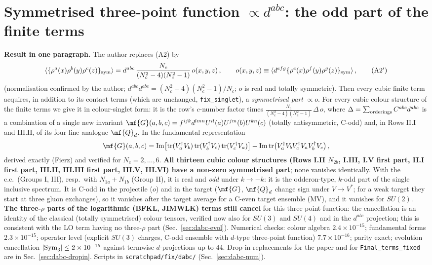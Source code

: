 \section{Symmetrised three-point function $\propto d^{abc}$: the odd part of the finite terms}\label{sec:dabc}
\noindent\textbf{Result in one paragraph.} The author replaces (A2) by
\begin{align}
\langle\{\rho^{a}(x)\rho^{b}(y)\rho^{c}(z)\}_{\rm sym}\rangle=d^{abc}\,\frac{N_{c}}{(N_{c}^{2}-4)(N_{c}^{2}-1)}\,o(x,y,z)\,,\qquad o(x,y,z)\equiv\langle d^{efg}\{\rho^{e}(x)\rho^{f}(y)\rho^{g}(z)\}_{\rm sym}\rangle\,,\tag{A2$'$}
\end{align}
(normalisation confirmed by the author; $d^{abc}d^{abc}=(N_{c}^{2}-4)(N_{c}^{2}-1)/N_{c}$; $o$ is real and totally symmetric). Then every cubic finite term acquires, in addition to its contact terms (which are unchanged, \texttt{fix\_singlet}), a \emph{symmetrised part} $\propto o$. For every cubic colour structure of the finite terms we give it in colour-singlet form: it is the row's $c$-number factor times $\frac{N_{c}}{(N_{c}^{2}-4)(N_{c}^{2}-1)}\,\Delta\,o$, where $\Delta=\sum_{\rm orderings}C^{abc}d^{abc}$ is a combination of a single new invariant $\mf{G}(a,b,c)=f^{ijk}d^{lmn}U^{il}(a)U^{jm}(b)U^{kn}(c)$ (totally antisymmetric, C-odd) and, in Rows II.I and III.II, of its four-line analogue $\mf{Q}_{d}$. In the fundamental representation
\begin{align}
\mf{G}(a,b,c)={\rm Im}\big[{\rm tr}(V_{a}^{\dagger}V_{b})\,{\rm tr}(V_{b}^{\dagger}V_{c})\,{\rm tr}(V_{c}^{\dagger}V_{a})\big]+{\rm Im}\,{\rm tr}\big(V_{a}^{\dagger}V_{b}V_{c}^{\dagger}V_{a}V_{b}^{\dagger}V_{c}\big)\,,\notag
\end{align}
derived exactly (Fierz) and verified for $N_{c}=2,\dots,6$. \textbf{All thirteen cubic colour structures (Rows I.II $N_{2b}$, I.III, I.V first part, II.I first part, III.II, III.III first part, III.V, III.VI) have a non-zero symmetrised part}; none vanishes identically. With the c.c.\ (Groups I, III), resp.\ with $N_{1a}+N_{1b}$ (Group II), it is real and \emph{odd} under $k\to-k$: it is the odderon-type, $k$-odd part of the single inclusive spectrum. It is C-odd in the projectile ($o$) and in the target ($\mf{G}$, $\mf{Q}_{d}$ change sign under $V\to V^{*}$; for a weak target they start at three gluon exchanges), so it vanishes after the target average for a C-even target ensemble (MV), and it vanishes for $SU(2)$. \textbf{The three-$\rho$ parts of the logarithmic (BFKL, JIMWLK) terms still cancel} for this three-point function: the cancellation is an identity of the classical (totally symmetrised) colour tensors, verified now also for $SU(3)$ and $SU(4)$ and in the $d^{abc}$ projection; this is consistent with the LO term having no three-$\rho$ part (Sec.~\ref{sec:dabc-evol}). Numerical checks: colour algebra $2.4\times10^{-15}$; fundamental forms $2.3\times10^{-15}$; operator level (explicit $SU(3)$ charges, C-odd ensemble with $d$-type three-point function) $7.7\times10^{-16}$; parity exact; evolution cancellation $|{\rm Sym}_{3}|\le2\times10^{-15}$ against termwise $d$-projections up to $44$. Drop-in replacements for the paper and for \texttt{Final\_terms\_fixed} are in Sec.~\ref{sec:dabc-dropin}. Scripts in \texttt{scratchpad/fix/dabc/} (Sec.~\ref{sec:dabc-num}).


